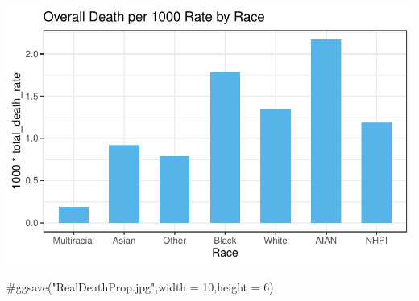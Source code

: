 \documentclass[
  letterpaper,
  DIV=11,
  numbers=noendperiod]{scrartcl}
\newenvironment{Shaded}{\begin{snugshade}}{\end{snugshade}}
\newcommand{\CommentTok}[1]{\textcolor[rgb]{0.37,0.37,0.37}{#1}}
\begin{document}
\includegraphics{StatsForFinalCSV_files/figure-pdf/unnamed-chunk-9-2.pdf}

\begin{Shaded}
\begin{Highlighting}[]
\CommentTok{\#ggsave("RealDeathProp.jpg",width = 10,height = 6)}
\end{Highlighting}
\end{Shaded}
\end{document}
